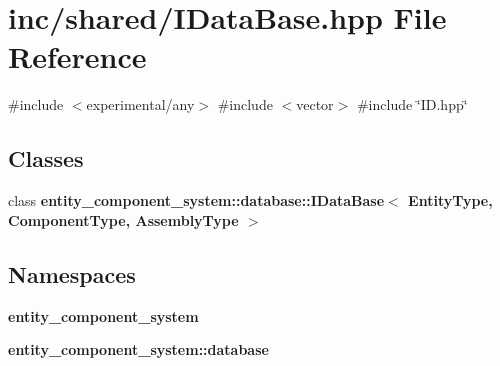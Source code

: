 \section{inc/shared/\+I\+Data\+Base.hpp File Reference}
\label{_i_data_base_8hpp}
{\ttfamily \#include $<$experimental/any$>$}\newline
{\ttfamily \#include $<$vector$>$}\newline
{\ttfamily \#include \char`\"{}I\+D.\+hpp\char`\"{}}\newline
\subsection*{Classes}
\begin{DoxyCompactItemize}
\item 
class {\bf entity\+\_\+component\+\_\+system\+::database\+::\+I\+Data\+Base$<$ Entity\+Type, Component\+Type, Assembly\+Type $>$}
\end{DoxyCompactItemize}
\subsection*{Namespaces}
\begin{DoxyCompactItemize}
\item 
 {\bf entity\+\_\+component\+\_\+system}
\item 
 {\bf entity\+\_\+component\+\_\+system\+::database}
\end{DoxyCompactItemize}
